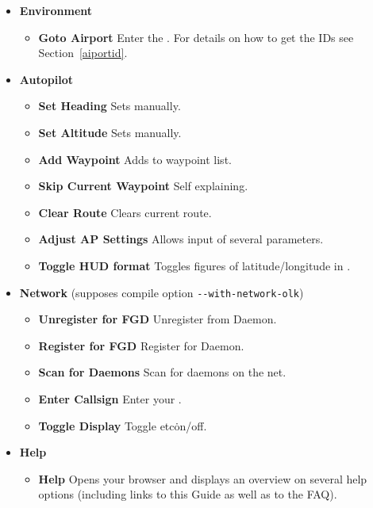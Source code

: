 \begin{itemize}
\item \textbf{Environment}
 \begin{itemize}
 \item \textbf{Goto Airport} Enter the . For details on how to get the IDs
  see Section~\ref{aiportid}.
 \end{itemize}

 \item \textbf{Autopilot}
 \begin{itemize}
 \item \textbf{Set Heading} Sets  manually.
 \item \textbf{Set Altitude} Sets  manually.
 \item \textbf{Add Waypoint} Adds  to waypoint list.
 \item \textbf{Skip Current Waypoint} Self explaining.
 \item \textbf{Clear Route} Clears current route.
 \item \textbf{Adjust AP Settings} Allows input of several  parameters.
 \item \textbf{Toggle HUD format} Toggles figures of latitude/longitude in .
 \end{itemize}
 
 \item\textbf{Network} (supposes compile option \texttt{-$ $-with-network-olk})
 \begin{itemize}
 \item \textbf{Unregister for FGD} Unregister from \FlightGear{} Daemon.
 \item \textbf{Register for FGD} Register for \FlightGear{} Daemon.
 \item \textbf{Scan for Daemons} Scan for daemons on the net.
 \item \textbf{Enter Callsign} Enter your . 
 \item \textbf{Toggle Display} Toggle  etc\. on/off. 
 
 \end{itemize}

 \item \textbf{Help}
 \begin{itemize}
 \item \textbf{Help} Opens your browser and displays an overview on
  several help options (including links to this Guide as well as to the
  FAQ).
 \end{itemize}
\end{itemize}

